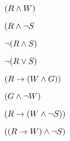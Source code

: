 \documentclass[PHIL101-Textbook.tex]{subfiles}
\begin{document}


\begin{earg}
\item $(R \land W)$ %
\item $(R \land \neg S$ %
\item $\neg(R \land S)$ %
\item $\neg(R \vee S)$ %
\item $(R \rightarrow (W \land G))$ %
\item $(G \land \neg W)$ %
\item $(R \rightarrow (W \land \neg S))$ %
\item $((R \rightarrow W) \land \neg S)$ %
\end{earg}


\end{document}
